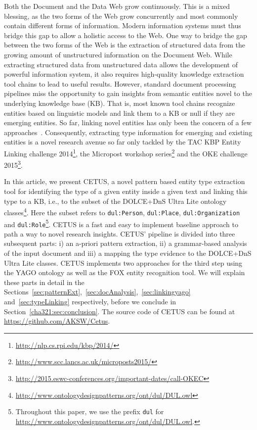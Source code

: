 Both the Document and the Data Web grow continuously. This is a mixed blessing, as the two forms of the Web grow concurrently and most commonly contain different forms of information. Modern information systems must thus bridge this gap to allow a holistic access to the Web. One way to bridge the gap between the two forms of the Web is the extraction of structured data from the growing amount of unstructured information on the Document Web. 
While extracting structured data from unstructured data allows the development of powerful information system, it also requires high-quality knowledge extraction tool chains to lead to useful results. 
However, standard document processing pipelines miss the opportunity to gain insights from semantic entities novel to the underlying knowledge base (KB). 
That is, most known tool chains recognize entities based on linguistic models and link them to a KB or null if they are emerging entities. 
So far, linking novel entities has only been the concern of a few approaches~\cite{AIDA,agdistis_iswc}.
Consequently, extracting type information for emerging and existing entities is a novel research avenue so far only tackled by the TAC KBP Entity Linking challenge 2014\footnote{\url{http://nlp.cs.rpi.edu/kbp/2014/}}, the Micropost workshop series\footnote{\url{http://www.scc.lancs.ac.uk/microposts2015/}} and the OKE challenge 2015\footnote{\url{http://2015.eswc-conferences.org/important-dates/call-OKEC}}.

In this article, we present CETUS, a novel pattern based entity type extraction tool for identifying the type of a given entity inside a given text and linking this type to a KB, i.e., to the subset of the DOLCE+DnS Ultra Lite ontology classes\footnote{\url{http://www.ontologydesignpatterns.org/ont/dul/DUL.owl}}.
Here the subset refers to \texttt{dul:Person}, \texttt{dul:Place}, \texttt{dul:Organization} and \texttt{dul:Role}\footnote{Throughout this paper, we use the prefix \texttt{dul} for \url{http://www.ontologydesignpatterns.org/ont/dul/DUL.owl}.}.
CETUS is a fast and easy to implement baseline approach to path a way to novel research insights.
CETUS' pipeline is divided into three subsequent parts: i) an a-priori pattern extraction, ii) a grammar-based analysis of the input document and iii) a mapping the type evidence to the DOLCE+DnS Ultra Lite classes. 
CETUS implements two approaches for the third step using the YAGO ontology as well as the FOX entity recognition tool.
We will explain these parts in detail in the Sections~\ref{sec:patternExt},~\ref{sec:docAnalysis},~\ref{sec:linkingyago} and~\ref{sec:typeLinking} respectively, before we conclude in Section~\ref{cha321:sec:conclusion}. The source code of CETUS can be found at \url{https://github.com/AKSW/Cetus}.


